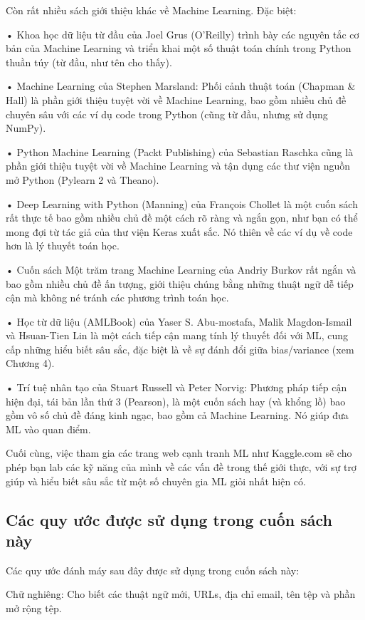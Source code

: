 Còn rất nhiều sách giới thiệu khác về Machine Learning. Đặc biệt:

• Khoa học dữ liệu từ đầu của Joel Grus (O'Reilly) trình bày các nguyên tắc cơ bản của Machine Learning và triển khai một số thuật toán chính trong Python thuần túy (từ đầu, như tên cho thấy).

• Machine Learning của Stephen Marsland: Phối cảnh thuật toán (Chapman \& Hall) là phần giới thiệu tuyệt vời về Machine Learning, bao gồm nhiều chủ đề chuyên sâu với các ví dụ code trong Python (cũng từ đầu, nhưng sử dụng NumPy).

• Python Machine Learning (Packt Publishing) của Sebastian Raschka cũng là phần giới thiệu tuyệt vời về Machine Learning và tận dụng các thư viện nguồn mở Python (Pylearn 2 và Theano).

• Deep Learning with Python (Manning) của François Chollet là một cuốn sách rất thực tế bao gồm nhiều chủ đề một cách rõ ràng và ngắn gọn, như bạn có thể mong đợi từ tác giả của thư viện Keras xuất sắc. Nó thiên về các ví dụ về code hơn là lý thuyết toán học.

• Cuốn sách Một trăm trang Machine Learning của Andriy Burkov rất ngắn và bao gồm nhiều chủ đề ấn tượng, giới thiệu chúng bằng những thuật ngữ dễ tiếp cận mà không né tránh các phương trình toán học.

• Học từ dữ liệu (AMLBook) của Yaser S. Abu-mostafa, Malik Magdon-Ismail và Hsuan-Tien Lin là một cách tiếp cận mang tính lý thuyết đối với ML, cung cấp những hiểu biết sâu sắc, đặc biệt là về sự đánh đổi giữa bias/variance (xem Chương 4).

• Trí tuệ nhân tạo của Stuart Russell và Peter Norvig: Phương pháp tiếp cận hiện đại, tái bản lần thứ 3 (Pearson), là một cuốn sách hay (và khổng lồ) bao gồm vô số chủ đề đáng kinh ngạc, bao gồm cả Machine Learning. Nó giúp đưa ML vào quan điểm.

Cuối cùng, việc tham gia các trang web cạnh tranh ML như Kaggle.com sẽ cho phép bạn lab các kỹ năng của mình về các vấn đề trong thế giới thực, với sự trợ giúp và hiểu biết sâu sắc từ một số chuyên gia ML giỏi nhất hiện có.

\subsection{Các quy ước được sử dụng trong cuốn sách này}

Các quy ước đánh máy sau đây được sử dụng trong cuốn sách này:

Chữ nghiêng: Cho biết các thuật ngữ mới, URLs, địa chỉ email, tên tệp và phần mở rộng tệp.

